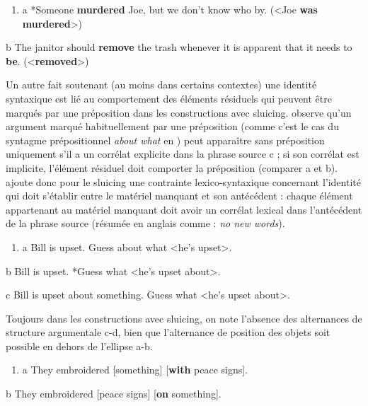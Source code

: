 \begin{enumerate}
\item \label{bkm:Ref306039144}a  *Someone \textbf{murdered} Joe, but we don't know who by. ({\textless}Joe \textbf{was murdered}{\textgreater}) 


\end{enumerate}
  b  The janitor should \textbf{remove} the trash whenever it is apparent that it needs to \textbf{be}. ({\textless}\textbf{removed}{\textgreater}) 

Un autre fait soutenant (au moins dans certains contextes) une identité syntaxique est lié au comportement des éléments résiduels qui peuvent être marqués par une préposition dans les constructions avec sluicing. \citet{Chung2005} observe qu'un argument marqué habituellement par une préposition (comme c'est le cas du syntagme prépositionnel \textit{about what} en ) peut apparaître sans préposition uniquement s'il a un corrélat explicite dans la phrase source c ; si son corrélat est implicite, l'élément résiduel doit comporter la préposition (comparer a et b). \citet{Chung2005} ajoute donc pour le sluicing une contrainte lexico-syntaxique concernant l'identité qui doit s'établir entre le matériel manquant et son antécédent : chaque élément appartenant au matériel manquant doit avoir un corrélat lexical dans l'antécédent de la phrase source (résumée en anglais comme : \textit{no new words}). 


\begin{enumerate}
\item \label{bkm:Ref306040699}a  Bill is upset. Guess about what {\textless}he's upset{\textgreater}. 


\end{enumerate}
  b  Bill is upset. *Guess what {\textless}he's upset about{\textgreater}.

  c  Bill is upset about something. Guess what {\textless}he's upset about{\textgreater}. 

Toujours dans les constructions avec sluicing, on note l'absence des alternances de structure argumentale c-d, bien que l'alternance de position des objets soit possible en dehors de l'ellipse a-b.


\begin{enumerate}
\item \label{bkm:Ref306041094}a  They embroidered [something] [\textbf{with} peace signs]. 


\end{enumerate}
  b  They embroidered [peace signs] [\textbf{on} something].

